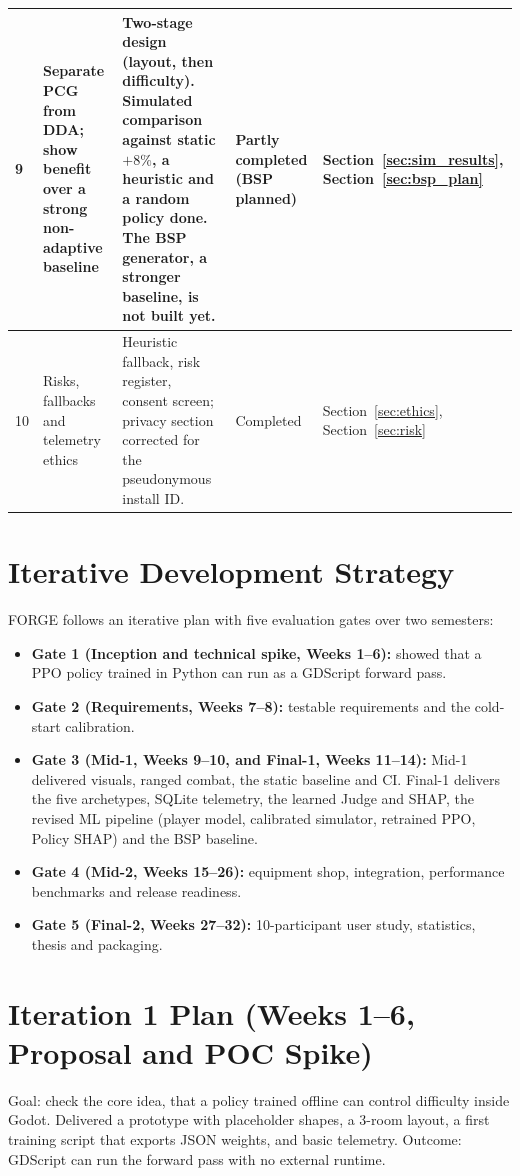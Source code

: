 \begin{table}[!htbp]
\begin{tabular}{p{}p{}p{}p{}p{}}
\midrule
9 & Separate PCG from DDA; show benefit over a strong non-adaptive baseline & Two-stage design (layout, then difficulty). Simulated comparison against static $+8\%$, a heuristic and a random policy done. The BSP generator, a stronger baseline, is not built yet. & Partly completed (BSP planned) & Section~\ref{sec:sim_results}, Section~\ref{sec:bsp_plan} \\
\midrule
10 & Risks, fallbacks and telemetry ethics & Heuristic fallback, risk register, consent screen; privacy section corrected for the pseudonymous install ID. & Completed & Section~\ref{sec:ethics}, Section~\ref{sec:risk} \\
\bottomrule
\end{tabular}
\end{table}

\section{Iterative Development Strategy}
FORGE follows an iterative plan with five evaluation gates over two semesters:
\begin{itemize}
    \item \textbf{Gate 1 (Inception and technical spike, Weeks 1--6):} showed that a PPO policy trained in Python can run as a GDScript forward pass.
    \item \textbf{Gate 2 (Requirements, Weeks 7--8):} testable requirements and the cold-start calibration.
    \item \textbf{Gate 3 (Mid-1, Weeks 9--10, and Final-1, Weeks 11--14):} Mid-1 delivered visuals, ranged combat, the static baseline and CI. Final-1 delivers the five archetypes, SQLite telemetry, the learned Judge and SHAP, the revised ML pipeline (player model, calibrated simulator, retrained PPO, Policy SHAP) and the BSP baseline.
    \item \textbf{Gate 4 (Mid-2, Weeks 15--26):} equipment shop, integration, performance benchmarks and release readiness.
    \item \textbf{Gate 5 (Final-2, Weeks 27--32):} 10-participant user study, statistics, thesis and packaging.
\end{itemize}

\section{Iteration 1 Plan (Weeks 1--6, Proposal and POC Spike)}
Goal: check the core idea, that a policy trained offline can control difficulty inside Godot. Delivered a prototype with placeholder shapes, a 3-room layout, a first training script that exports JSON weights, and basic telemetry. Outcome: GDScript can run the forward pass with no external runtime.

